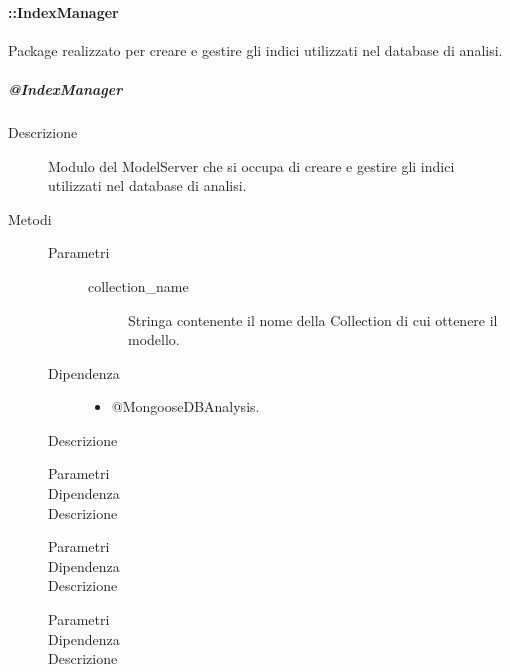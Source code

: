 \paragraph{::IndexManager}
Package realizzato per creare e gestire gli indici utilizzati nel database di analisi.
\subparagraph{@IndexManager}
\begin{description}
 \item[Descrizione]
 Modulo del ModelServer che si occupa di creare e gestire gli indici utilizzati nel database di analisi. 
 \item[Metodi]
  \begin{mldescription}
	\begin{description}
	 \item[Parametri]
	  \begin{description}
	   \item[collection\_name]
	   Stringa contenente il nome della Collection di cui ottenere il modello.
	  \end{description}
	 \item[Dipendenza]
	  \begin{itemize}
	   \item @MongooseDBAnalysis.
	  \end{itemize}
	 \item[Descrizione]
	 
	\end{description}	    
    
    \begin{description}
	 \item[Parametri]
	 \item[Dipendenza]
	 \item[Descrizione]
	\end{description}	    
    
    \begin{description}
	 \item[Parametri]
	 \item[Dipendenza]
	 \item[Descrizione]
	\end{description}	    
    
    \begin{description}
	 \item[Parametri]
	 \item[Dipendenza]
	 \item[Descrizione]
	\end{description}	    
    

\end{mldescription}
\end{description}
